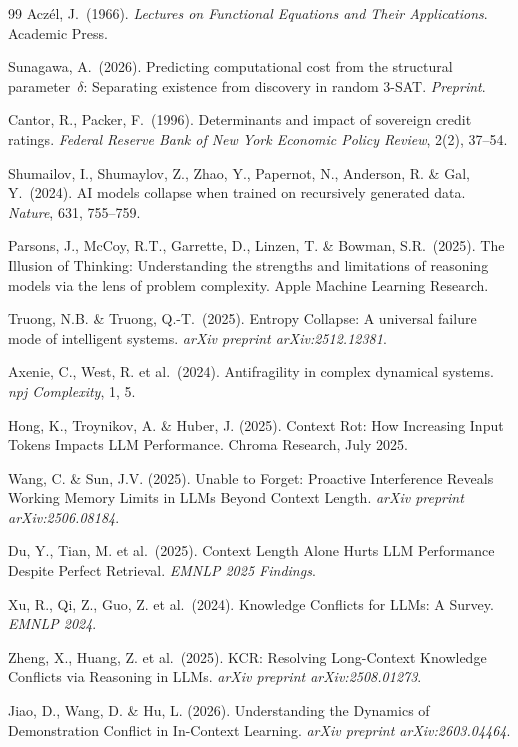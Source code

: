 \documentclass[11pt,a4paper]{article}
\begin{document}
\begin{thebibliography}{99}
Acz\'{e}l, J.\ (1966).
\emph{Lectures on Functional Equations and Their Applications}.
Academic Press.

Sunagawa, A.\ (2026).
Predicting computational cost from the structural parameter~$\delta$: Separating existence from discovery in random 3-SAT.
\emph{Preprint}.

Cantor, R., Packer, F.\ (1996).
Determinants and impact of sovereign credit ratings.
\emph{Federal Reserve Bank of New York Economic Policy Review}, 2(2), 37--54.

Shumailov, I., Shumaylov, Z., Zhao, Y., Papernot, N., Anderson, R. \& Gal, Y.\ (2024).
AI models collapse when trained on recursively generated data.
\emph{Nature}, 631, 755--759.

Parsons, J., McCoy, R.T., Garrette, D., Linzen, T. \& Bowman, S.R.\ (2025).
The Illusion of Thinking: Understanding the strengths and limitations of reasoning models via the lens of problem complexity.
Apple Machine Learning Research.

Truong, N.B. \& Truong, Q.-T.\ (2025).
Entropy Collapse: A universal failure mode of intelligent systems.
\emph{arXiv preprint arXiv:2512.12381}.

Axenie, C., West, R. et al.\ (2024).
Antifragility in complex dynamical systems.
\emph{npj Complexity}, 1, 5.

Hong, K., Troynikov, A. \& Huber, J. (2025).
Context Rot: How Increasing Input Tokens Impacts LLM Performance.
Chroma Research, July 2025.

Wang, C. \& Sun, J.V. (2025).
Unable to Forget: Proactive Interference Reveals Working Memory Limits in LLMs Beyond Context Length.
\emph{arXiv preprint arXiv:2506.08184}.

Du, Y., Tian, M. et al.\ (2025).
Context Length Alone Hurts LLM Performance Despite Perfect Retrieval.
\emph{EMNLP 2025 Findings}.

Xu, R., Qi, Z., Guo, Z. et al.\ (2024).
Knowledge Conflicts for LLMs: A Survey.
\emph{EMNLP 2024}.

Zheng, X., Huang, Z. et al.\ (2025).
KCR: Resolving Long-Context Knowledge Conflicts via Reasoning in LLMs.
\emph{arXiv preprint arXiv:2508.01273}.

Jiao, D., Wang, D. \& Hu, L. (2026).
Understanding the Dynamics of Demonstration Conflict in In-Context Learning.
\emph{arXiv preprint arXiv:2603.04464}.

\end{thebibliography}
\end{document}
